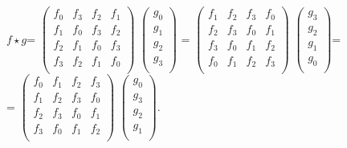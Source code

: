 \documentclass{mai_book}
\begin{document}
\begin{center}
$f \star g$=
$\begin{pmatrix}
f_0 & f_3 & f_2 & f_1 \\
f_1 & f_0 & f_3 & f_2 \\
f_2 & f_1 & f_0 & f_3 \\
f_3 & f_2 & f_1 & f_0 \\
\end{pmatrix}$
$\begin{pmatrix}
g_0 \\
g_1 \\
g_2 \\
g_3 \\
\end{pmatrix}$ = 
$\begin{pmatrix}
f_1 & f_2 & f_3 & f_0 \\
f_2 & f_3 & f_0 & f_1 \\
f_3 & f_0 & f_1 & f_2 \\
f_0 & f_1 & f_2 & f_3 \\
\end{pmatrix}$
$\begin{pmatrix}
g_3 \\
g_2 \\
g_1 \\
g_0 \\
\end{pmatrix}$=\smallskip\\
= $\begin{pmatrix}
f_0 & f_1 & f_2 & f_3 \\
f_1 & f_2 & f_3 & f_0 \\
f_2 & f_3 & f_0 & f_1 \\
f_3 & f_0 & f_1 & f_2 \\
\end{pmatrix}$
$\begin{pmatrix}
g_0 \\
g_3 \\
g_2 \\
g_1 \\
\end{pmatrix}.$
\end{center}
\end{document}

